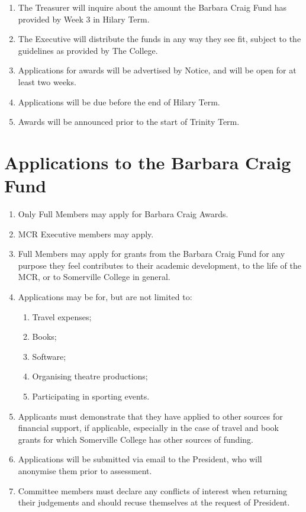 \documentclass[11pt, a4paper]{article}
\begin{document}
\begin{enumerate}
	\item The Treasurer will inquire about the amount the Barbara Craig Fund has provided by Week 3 in Hilary Term.
    \item The Executive will distribute the funds in any way they see fit, subject to the guidelines as provided by The College.
    \item Applications for awards will be advertised by Notice, and will be open for at least two weeks.
    \item Applications will be due before the end of Hilary Term.
    \item Awards will be announced prior to the start of Trinity Term.
\end{enumerate}





\section{Applications to the Barbara Craig Fund}
\label{sec:applications}

\begin{enumerate}
	\item Only Full Members may apply for Barbara Craig Awards.
    \item MCR Executive members may apply.
    \item Full Members may apply for grants from the Barbara Craig Fund for any purpose they feel contributes to their academic development, to the life of the MCR, or to Somerville College in general.
    \item Applications may be for, but are not limited to:
    	\begin{enumerate}
        	\item Travel expenses;
            \item Books;
            \item Software;
            \item Organising theatre productions;
            \item Participating in sporting events.
        \end{enumerate}
    \item Applicants must demonstrate that they have applied to other sources for financial support, if applicable, especially in the case of travel and book grants for which Somerville College has other sources of funding.
    \item Applications will be submitted via email to the President, who will anonymise them prior to  assessment.
    \item Committee members must declare any conflicts of interest when returning their judgements and should recuse themselves at the request of President.
\end{enumerate}
\end{document}
